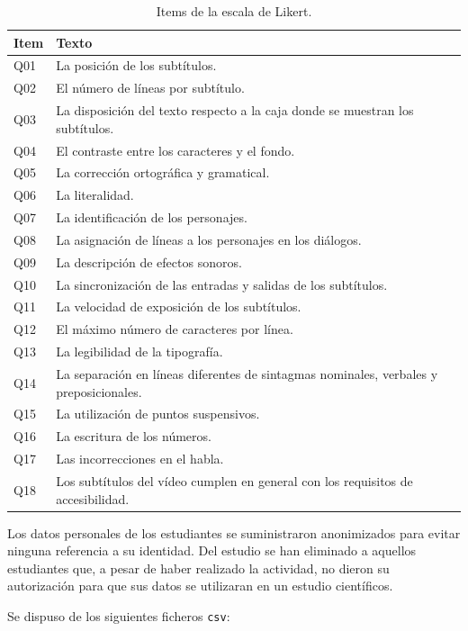\documentclass[
  12pt,
  a4paper,
  extrafontsizes,
  onecolumn,
  openright]{memoir}
\begin{document}
\hypertarget{tbl-likert-scale}{}
\begin{longtable}{ll}
\caption{\label{tbl-likert-scale}Items de la escala de Likert. }\tabularnewline

\toprule
Item & Texto \\ 
\midrule
Q01 & La posición de los subtítulos. \\ 
Q02 & El número de líneas por subtítulo. \\ 
Q03 & La disposición del texto respecto a la caja donde se muestran los subtítulos. \\ 
Q04 & El contraste entre los caracteres y el fondo. \\ 
Q05 & La corrección ortográfica y gramatical. \\ 
Q06 & La literalidad. \\ 
Q07 & La identificación de los personajes. \\ 
Q08 & La asignación de líneas a los personajes en los diálogos. \\ 
Q09 & La descripción de efectos sonoros. \\ 
Q10 & La sincronización de las entradas y salidas de los subtítulos. \\ 
Q11 & La velocidad de exposición de los subtítulos. \\ 
Q12 & El máximo número de caracteres por línea. \\ 
Q13 & La legibilidad de la tipografía. \\ 
Q14 & La separación en líneas diferentes de sintagmas nominales, verbales y preposicionales. \\ 
Q15 & La utilización de puntos suspensivos. \\ 
Q16 & La escritura de los números. \\ 
Q17 & Las incorrecciones en el habla. \\ 
Q18 & Los subtítulos del vídeo cumplen en general con los requisitos de accesibilidad. \\ 
\bottomrule
\end{longtable}

Los datos personales de los estudiantes se suministraron anonimizados
para evitar ninguna referencia a su identidad. Del estudio se han
eliminado a aquellos estudiantes que, a pesar de haber realizado la
actividad, no dieron su autorización para que sus datos se utilizaran en
un estudio científicos.

\clearpage

Se dispuso de los siguientes ficheros \texttt{csv}:
\end{document}
